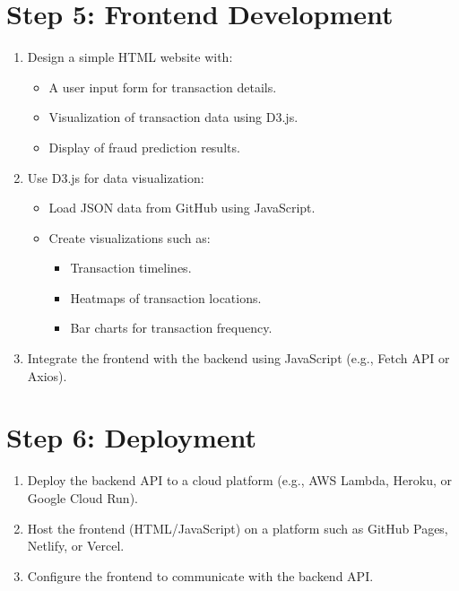 \documentclass[12pt]{article}
\begin{document}
\section*{Step 5: Frontend Development}
\begin{enumerate}
    \item Design a simple HTML website with:
    \begin{itemize}
        \item A user input form for transaction details.
        \item Visualization of transaction data using D3.js.
        \item Display of fraud prediction results.
    \end{itemize}
    \item Use D3.js for data visualization:
    \begin{itemize}
        \item Load JSON data from GitHub using JavaScript.
        \item Create visualizations such as:
        \begin{itemize}
            \item Transaction timelines.
            \item Heatmaps of transaction locations.
            \item Bar charts for transaction frequency.
        \end{itemize}
    \end{itemize}
    \item Integrate the frontend with the backend using JavaScript (e.g., Fetch API or Axios).
\end{enumerate}

\section*{Step 6: Deployment}
\begin{enumerate}
    \item Deploy the backend API to a cloud platform (e.g., AWS Lambda, Heroku, or Google Cloud Run).
    \item Host the frontend (HTML/JavaScript) on a platform such as GitHub Pages, Netlify, or Vercel.
    \item Configure the frontend to communicate with the backend API.
\end{enumerate}
\end{document}
